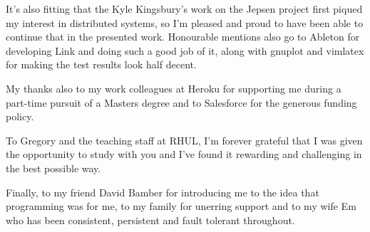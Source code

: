 \documentclass[11pt]{article} %
\theoremstyle{plain}
\theoremstyle{definition}
\begin{document}
It's also fitting that the Kyle Kingsbury's work on the Jepsen project first
piqued my interest in distributed systems, so I'm pleased and proud to have
been able to continue that in the presented work. Honourable mentions also go
to Ableton for developing Link and doing such a good job of it, along with
gnuplot and vimlatex for making the test results look half decent.

My thanks also to my work colleagues at Heroku for supporting me during a
part-time pursuit of a Masters degree and to Salesforce for the generous
funding policy.

To Gregory and the teaching staff at RHUL, I'm forever grateful that I was
given the opportunity to study with you and I've found it rewarding and
challenging in the best possible way.

Finally, to my friend David Bamber for introducing me to the idea that
programming was for me, to my family for unerring support and to my wife Em who
has been consistent, persistent and fault tolerant throughout.
\end{document}

